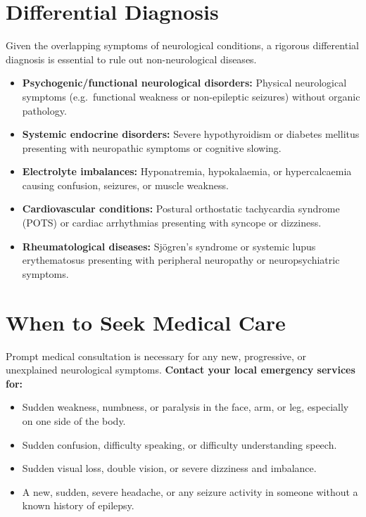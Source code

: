 \section*{Differential Diagnosis}
Given the overlapping symptoms of neurological conditions, a rigorous differential diagnosis is essential to rule out non-neurological diseases.
\begin{itemize}
    \item \textbf{Psychogenic/functional neurological disorders:} Physical neurological symptoms (e.g.\ functional weakness or non-epileptic seizures) without organic pathology.
    \item \textbf{Systemic endocrine disorders:} Severe hypothyroidism or diabetes mellitus presenting with neuropathic symptoms or cognitive slowing.
    \item \textbf{Electrolyte imbalances:} Hyponatremia, hypokalaemia, or hypercalcaemia causing confusion, seizures, or muscle weakness.
    \item \textbf{Cardiovascular conditions:} Postural orthostatic tachycardia syndrome (POTS) or cardiac arrhythmias presenting with syncope or dizziness.
    \item \textbf{Rheumatological diseases:} Sjögren's syndrome or systemic lupus erythematosus presenting with peripheral neuropathy or neuropsychiatric symptoms.
\end{itemize}

\section*{When to Seek Medical Care}
Prompt medical consultation is necessary for any new, progressive, or unexplained neurological symptoms.
\hfill \break
\textbf{Contact your local emergency services for:}
\begin{itemize}
    \item Sudden weakness, numbness, or paralysis in the face, arm, or leg, especially on one side of the body.
    \item Sudden confusion, difficulty speaking, or difficulty understanding speech.
    \item Sudden visual loss, double vision, or severe dizziness and imbalance.
    \item A new, sudden, severe headache, or any seizure activity in someone without a known history of epilepsy.
\end{itemize}

